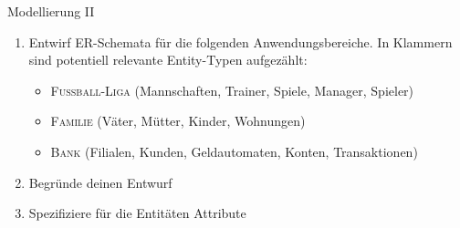 \documentclass[12pt,a4paper,notitlepage,leqno]{article}
\begin{document}
\begin{paufgabe}{Modellierung II}
\begin{enumerate}
    \item Entwirf ER-Schemata für die folgenden Anwendungsbereiche. In Klammern sind potentiell relevante Entity-Typen aufgezählt:
    \begin{itemize}
    \item \textsc{Fußball-Liga} (Mannschaften, Trainer, Spiele, Manager, Spieler)
    \item \textsc{Familie} (Väter, Mütter, Kinder, Wohnungen)
    \item \textsc{Bank} (Filialen, Kunden, Geldautomaten, Konten, Transaktionen)
\end{itemize}
    \item Begründe deinen Entwurf
    \item Spezifiziere für die Entitäten Attribute
\end{enumerate}

\end{paufgabe}
\end{document}
